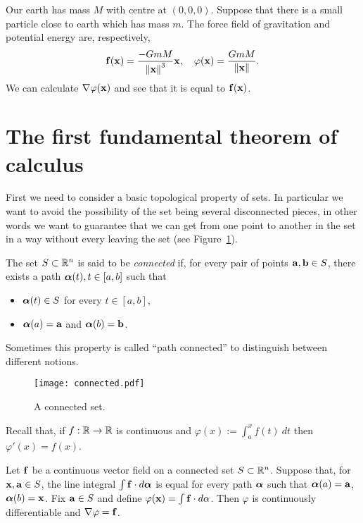 \begin{example}
    Our earth has mass \(M\) with centre at \((0,0,0)\).
    Suppose that there is a small particle close to earth which has mass \(m\).
    The force field of gravitation and potential energy are, respectively,
    \[
        \ff(\xx) = \frac{-GmM}{\norm{\xx}^3}\xx,
        \quad
        \varphi(\xx) = \frac{GmM}{\norm{\xx}}.
    \]
    We can calculate \(\nabla \varphi(\xx)\) and see that it is equal to \(\ff(\xx)\).
\end{example}


\section{The first fundamental theorem of calculus}

First we need to consider a basic topological property of sets.
In particular we want to avoid the possibility of the set being several disconnected pieces, in other words we want to guarantee that we can get from one point to another in the set in a way without every leaving the set (see Figure~\ref{fig:connected}).

\begin{definition}[connected]
    The set \(S\subset \bR^n\) is said to be \emph{connected} if, for every pair of points \(\aa,\bb\in S\), there exists a path \(\aalpha(t), t\in[a,b]\) such that
    \begin{itemize}
        \item \(\aalpha(t)\in S\) for every \( t\in[a,b]\),
        \item \(\aalpha(a)=\aa\) and \(\aalpha(b)=\bb\).
    \end{itemize}
\end{definition}

\noindent
Sometimes this property is called ``path connected'' to distinguish between different notions.

\begin{figure}[htbp]
    \begin{center}
        \texttt{[image: connected.pdf]}
        \caption{A connected set.}%
        \label{fig:connected}
    \end{center}
\end{figure}

Recall that, if \(f:\bR \to \bR\) is continuous and \(\varphi(x) := \int_a^x f(t) \ dt\) then \(\varphi'(x) = f(x)\).

\begin{theorem}
    Let \(\ff\) be a continuous vector field on a connected set \(S \subset \bR^n\).
    Suppose that, for \(\xx,\aa\in S\), the line integral \(\int \ff \cdot d\aalpha\) is equal for every path \(\aalpha\) such that \(\aalpha(a)=\aa\), \(\aalpha(b)=\xx\).
    Fix \(\aa\in S\) and define \(\varphi(\xx)= \int \ff \cdot d\alpha\).
    Then \(\varphi\) is continuously differentiable and \(\nabla \varphi = \ff\).
\end{theorem}

